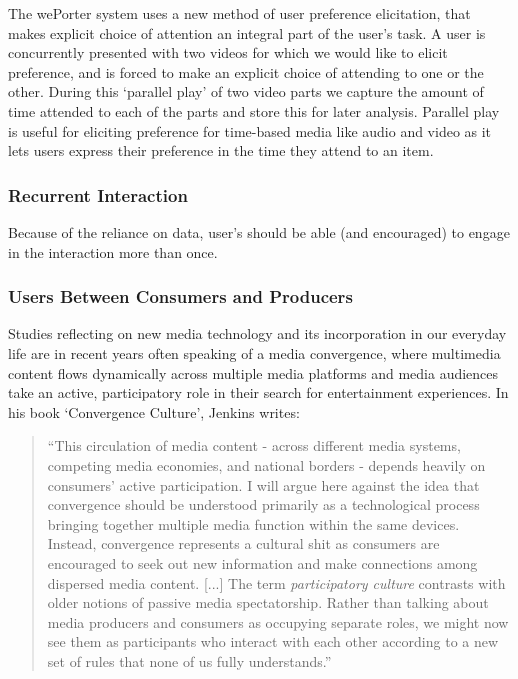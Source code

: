 The wePorter system uses a new method of user preference elicitation, that makes explicit choice of attention an integral part of the user's task. A user is concurrently presented with two videos for which we would like to elicit preference, and is forced to make an explicit choice of attending to one or the other. During this `parallel play' of two video parts we capture the amount of time attended to each of the parts and store this for later analysis. Parallel play is useful for eliciting preference for time-based media like audio and video as it lets users express their preference in the time they attend to an item.

\subsubsection{Recurrent Interaction}
Because of the reliance on data, user's should be able (and encouraged) to engage in the interaction more than once.

\subsubsection{Users Between Consumers and Producers}
Studies reflecting on new media technology and its incorporation in our everyday life are in recent years often speaking of a media convergence, where multimedia content flows dynamically across multiple media platforms and media audiences take an active, participatory role in their search for entertainment experiences. In his book `Convergence Culture', Jenkins writes:

\begin{quote}
  ``This circulation of media content - across different media systems, competing media economies, and national borders - depends heavily on consumers' active participation. I will argue here against the idea that convergence should be understood primarily as a technological process bringing together multiple media function within the same devices. Instead, convergence represents a cultural shit as consumers are encouraged to seek out new information and make connections among dispersed media content. [...] The term \emph{participatory culture} contrasts with older notions of passive media spectatorship. Rather than talking about media producers and consumers as occupying separate roles, we might now see them as participants who interact with each other according to a new set of rules that none of us fully understands.''\cite{jenkins2006convergence}
\end{quote}

